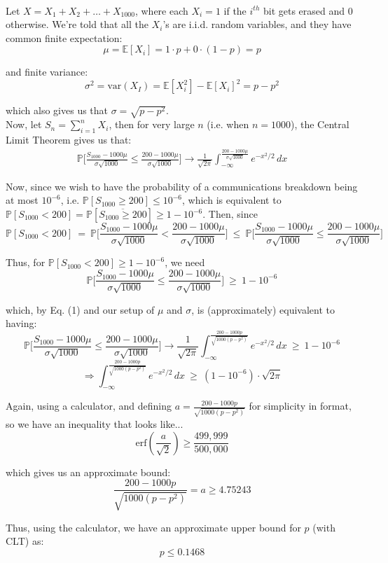 \documentclass{article}
\begin{document}
 \\

Let $X = X_1 + X_2 + \dots + X_1000$, where each $X_i = 1$ if the $i^{th}$ bit gets erased and 0 otherwise. We're told that all the $X_i$'s are i.i.d. random variables, and they have common finite expectation:
$$\mu = \mathbb{E}[X_i] = 1\cdot p + 0\cdot(1-p) = p$$

and finite variance:
$$\sigma^2 = \text{var}(X_I) =
\mathbb{E}[X_i^2] - \mathbb{E}[X_i]^2 =
p - p^2 $$

which also gives us that $\sigma = \sqrt{p-p^2}$. \\

Now, let $S_n = \sum\limits_{i=1}^n X_i$, then for very large $n$ (i.e. when $n=1000$), the Central Limit Theorem gives us that:
\begin{align}
\mathbb{P}\big[
	\frac{S_{1000} - 1000\mu}{\sigma\sqrt{1000}}
		\leq \frac{200-1000\mu}{\sigma\sqrt{1000}} \big]
\rightarrow
\frac{1}{\sqrt{2\pi}} \int_{-\infty}^{\frac{200-1000\mu}{\sigma\sqrt{1000}}}
	e^{-x^2/2} \, dx
\end{align}

Now, since we wish to have the probability of a communications breakdown being at most $10^{-6}$, i.e. $\mathbb{P}[S_{1000} \geq 200] \leq 10^{-6}$, which is equivalent to
$\mathbb{P}[S_{1000} < 200] =
\mathbb{P}[\overline{S_{1000} \geq 200}] \geq 1 - 10^{-6}$.
Then, since
$$\mathbb{P}[S_{1000} < 200]\ =\
\mathbb{P}\big[
	\frac{S_{1000} - 1000\mu}{\sigma\sqrt{1000}}
		< \frac{200-1000\mu}{\sigma\sqrt{1000}} \big]\ \leq\
\mathbb{P}\big[
	\frac{S_{1000} - 1000\mu}{\sigma\sqrt{1000}}
		\leq \frac{200-1000\mu}{\sigma\sqrt{1000}} \big] $$

Thus, for $\mathbb{P}[S_{1000} < 200] \geq 1 - 10^{-6}$, we need
$$\mathbb{P}\big[
	\frac{S_{1000} - 1000\mu}{\sigma\sqrt{1000}}
		\leq \frac{200-1000\mu}{\sigma\sqrt{1000}} \big]\ \geq\ 1 - 10^{-6}$$

which, by Eq. (1) and our setup of $\mu$ and $\sigma$, is (approximately) equivalent to having:
$$\mathbb{P}\big[
	\frac{S_{1000} - 1000\mu}{\sigma\sqrt{1000}}
		\leq \frac{200-1000\mu}{\sigma\sqrt{1000}} \big] \rightarrow
\frac{1}{\sqrt{2\pi}} \int_{-\infty}^{\frac{200-1000p}{\sqrt{1000(p-p^2)}}}
	e^{-x^2/2} \, dx
\ \geq\ 1 - 10^{-6}$$
$$\Longrightarrow
\int_{-\infty}^{\frac{200-1000p}{\sqrt{1000(p-p^2)}}}
	e^{-x^2/2} \, dx
\ \geq\
(1 - 10^{-6})\cdot\sqrt{2\pi}$$

Again, using a calculator, and defining
$a = \frac{200-1000p}{\sqrt{1000(p-p^2)}}$ for simplicity in format,
so we have an inequality that looks like...
$$ \text{erf}(\frac{a}{\sqrt{2}}) \geq \frac{499,999}{500,000}$$

which gives us an approximate bound:
$$\frac{200-1000p}{\sqrt{1000(p-p^2)}} = a \geq 4.75243$$

Thus, using the calculator, we have an approximate upper bound for $p$ (with CLT) as:
$$p \leq 0.1468$$
\end{document}
